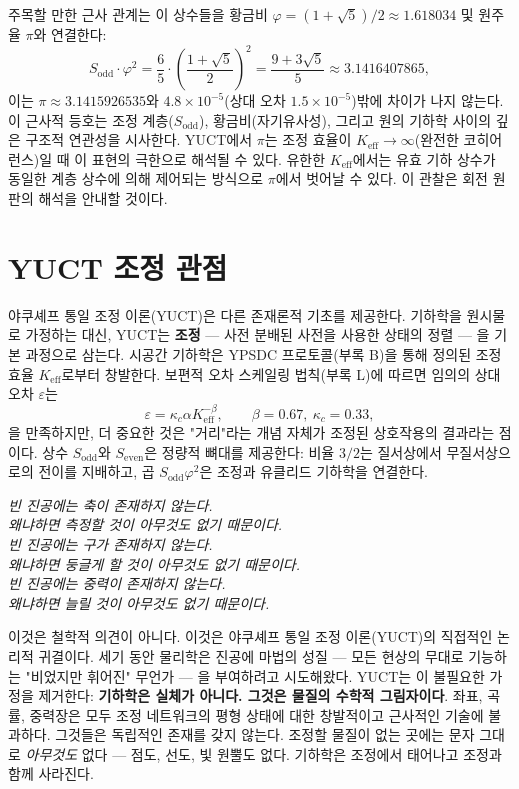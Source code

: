 \documentclass[12pt,a4paper]{article}
\newcommand{\kappac}{\kappa_c}
\newcommand{\eps}{\varepsilon}
\newcommand{\betaf}{\beta}
\newcommand{\Sodd}{S_{\mathrm{odd}}}
\newcommand{\Seven}{S_{\mathrm{even}}}
\begin{document}
	주목할 만한 근사 관계는 이 상수들을 황금비 \(\varphi = (1+\sqrt{5})/2 \approx 1.618034\) 및 원주율 \(\pi\)와 연결한다:
	\begin{equation}
		\Sodd \cdot \varphi^2 = \frac{6}{5} \cdot \left(\frac{1+\sqrt{5}}{2}\right)^2 = \frac{9+3\sqrt{5}}{5} \approx 3.1416407865,
	\end{equation}
	이는 \(\pi \approx 3.1415926535\)와 \(4.8\times10^{-5}\)(상대 오차 \(1.5\times10^{-5}\))밖에 차이가 나지 않는다. 이 근사적 등호는 조정 계층(\(\Sodd\)), 황금비(자기유사성), 그리고 원의 기하학 사이의 깊은 구조적 연관성을 시사한다. YUCT에서 \(\pi\)는 조정 효율이 \(K_{\mathrm{eff}} \to \infty\)(완전한 코히어런스)일 때 이 표현의 극한으로 해석될 수 있다. 유한한 \(K_{\mathrm{eff}}\)에서는 유효 기하 상수가 동일한 계층 상수에 의해 제어되는 방식으로 \(\pi\)에서 벗어날 수 있다. 이 관찰은 회전 원판의 해석을 안내할 것이다.
	
	\section{YUCT 조정 관점}
	\label{sec:yuct}
	
	야쿠셰프 통일 조정 이론(YUCT)은 다른 존재론적 기초를 제공한다. 기하학을 원시물로 가정하는 대신, YUCT는 \textbf{조정} — 사전 분배된 사전을 사용한 상태의 정렬 — 을 기본 과정으로 삼는다. 시공간 기하학은 YPSDC 프로토콜(부록 B)을 통해 정의된 조정 효율 \(K_{\mathrm{eff}}\)로부터 창발한다. 보편적 오차 스케일링 법칙(부록 L)에 따르면 임의의 상대 오차 \(\eps\)는
	\[
	\eps = \kappac \alpha K_{\mathrm{eff}}^{-\betaf}, \qquad \betaf = 0.67,\ \kappac = 0.33,
	\]
	을 만족하지만, 더 중요한 것은 "거리"라는 개념 자체가 조정된 상호작용의 결과라는 점이다. 상수 \(\Sodd\)와 \(\Seven\)은 정량적 뼈대를 제공한다: 비율 \(3/2\)는 질서상에서 무질서상으로의 전이를 지배하고, 곱 \(\Sodd\varphi^2\)은 조정과 유클리드 기하학을 연결한다.
	
	\begin{tcolorbox}[
		title={\bfseries 논리적으로 기본적인 진술},
		colback=blue!3!white,
		colframe=blue!50!black,
		fonttitle=\bfseries,
		sharp corners
		]
		\small
		\textit{빈 진공에는 축이 존재하지 않는다.\\왜냐하면 측정할 것이 아무것도 없기 때문이다.\\빈 진공에는 구가 존재하지 않는다.\\왜냐하면 둥글게 할 것이 아무것도 없기 때문이다.\\빈 진공에는 중력이 존재하지 않는다.\\왜냐하면 늘릴 것이 아무것도 없기 때문이다.}
		
		\medskip
		이것은 철학적 의견이 아니다. 이것은 야쿠셰프 통일 조정 이론(YUCT)의 직접적인 논리적 귀결이다. 세기 동안 물리학은 진공에 마법의 성질 — 모든 현상의 무대로 기능하는 "비었지만 휘어진" 무언가 — 을 부여하려고 시도해왔다. YUCT는 이 불필요한 가정을 제거한다: \textbf{기하학은 실체가 아니다. 그것은 물질의 수학적 그림자이다}. 좌표, 곡률, 중력장은 모두 조정 네트워크의 평형 상태에 대한 창발적이고 근사적인 기술에 불과하다. 그것들은 독립적인 존재를 갖지 않는다. 조정할 물질이 없는 곳에는 문자 그대로 \textit{아무것도} 없다 — 점도, 선도, 빛 원뿔도 없다. 기하학은 조정에서 태어나고 조정과 함께 사라진다.
	\end{tcolorbox}
	
\end{document}
